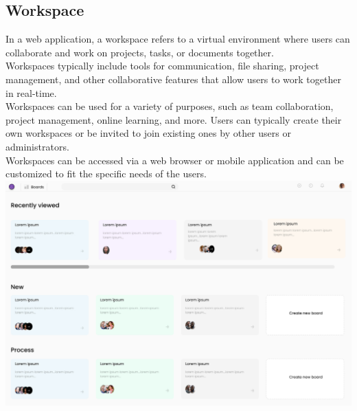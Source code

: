
\subsection{Workspace}

In a web application, a workspace refers to a virtual environment where users can collaborate and work on projects, tasks, or documents together.\\

Workspaces typically include tools for communication, file sharing, project management, and other collaborative features that allow users to work together in real-time.\\

Workspaces can be used for a variety of purposes, such as team collaboration, project management, online learning, and more. Users can typically create their own workspaces or be invited to join existing ones by other users or administrators.\\

Workspaces can be accessed via a web browser or mobile application and can be customized to fit the specific needs of the users.\\
\includegraphics[width=\columnwidth]{images/Workspace.jpg}

